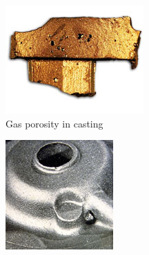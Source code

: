 \begin{figure}[h!] %
\centering
  \begin{subfigure}[t]{0.25\textwidth}
    \centering
	\includegraphics[width=\textwidth]{Chapter0/Graphics/porosity1.jpg}
	\caption{Gas porosity in casting}
    \label{fig:porosity1}
  \end{subfigure}
   \hspace{2cm}
   \begin{subfigure}[t]{0.25\textwidth}
    \centering
	\includegraphics[width=\textwidth]{Chapter0/Graphics/porosity2.jpg}

\end{subfigure}
\end{figure}
